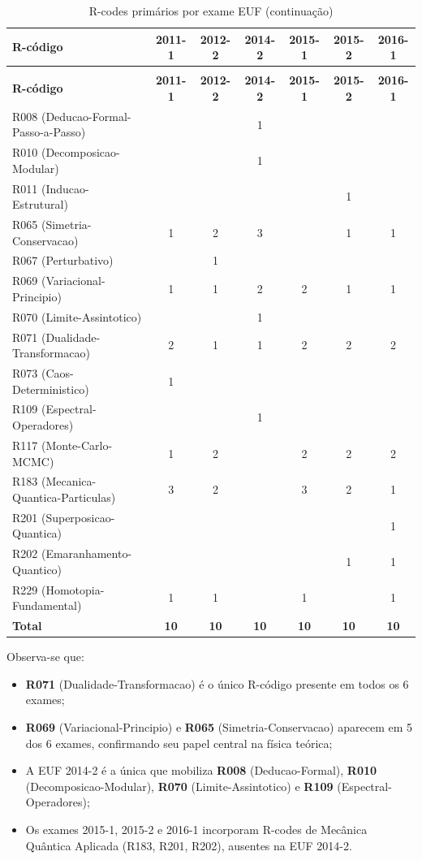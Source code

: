 \documentclass[12pt,a4paper]{article}
\newcommand{\rcode}[1]{\textcolor{azulprof}{\textbf{#1}}}
\begin{document}
\small
\begin{longtable}{lcccccc}
\caption{R-codes primários por exame EUF}
\label{tab:comparativo_rcodes}\\
\toprule
\textbf{R-código} & \textbf{2011-1} & \textbf{2012-2} & \textbf{2014-2} & \textbf{2015-1} & \textbf{2015-2} & \textbf{2016-1} \\
\midrule
\endfirsthead

\caption[]{R-codes primários por exame EUF (continuação)}\\
\toprule
\textbf{R-código} & \textbf{2011-1} & \textbf{2012-2} & \textbf{2014-2} & \textbf{2015-1} & \textbf{2015-2} & \textbf{2016-1} \\
\midrule
\endhead

\bottomrule
\endfoot

R008 (Deducao-Formal-Passo-a-Passo) & & & 1 & & & \\
R010 (Decomposicao-Modular) & & & 1 & & & \\
R011 (Inducao-Estrutural) & & & & & 1 & \\
R065 (Simetria-Conservacao) & 1 & 2 & 3 & & 1 & 1 \\
R067 (Perturbativo) & & 1 & & & & \\
R069 (Variacional-Principio) & 1 & 1 & 2 & 2 & 1 & 1 \\
R070 (Limite-Assintotico) & & & 1 & & & \\
R071 (Dualidade-Transformacao) & 2 & 1 & 1 & 2 & 2 & 2 \\
R073 (Caos-Deterministico) & 1 & & & & & \\
R109 (Espectral-Operadores) & & & 1 & & & \\
R117 (Monte-Carlo-MCMC) & 1 & 2 & & 2 & 2 & 2 \\
R183 (Mecanica-Quantica-Particulas) & 3 & 2 & & 3 & 2 & 1 \\
R201 (Superposicao-Quantica) & & & & & & 1 \\
R202 (Emaranhamento-Quantico) & & & & & 1 & 1 \\
R229 (Homotopia-Fundamental) & 1 & 1 & & 1 & & 1 \\
\midrule
\textbf{Total} & \textbf{10} & \textbf{10} & \textbf{10} & \textbf{10} & \textbf{10} & \textbf{10} \\
\end{longtable}

\normalsize
\noindent Observa-se que:
\begin{itemize}
  \item \rcode{R071} (Dualidade-Transformacao) é o único R-código presente
    em todos os 6 exames;
  \item \rcode{R069} (Variacional-Principio) e \rcode{R065}
    (Simetria-Conservacao) aparecem em 5 dos 6 exames, confirmando seu
    papel central na física teórica;
  \item A EUF 2014-2 é a única que mobiliza \rcode{R008}
    (Deducao-Formal), \rcode{R010} (Decomposicao-Modular),
    \rcode{R070} (Limite-Assintotico) e \rcode{R109}
    (Espectral-Operadores);
  \item Os exames 2015-1, 2015-2 e 2016-1 incorporam R-codes de
    Mecânica Quântica Aplicada (R183, R201, R202), ausentes na
    EUF 2014-2.
\end{itemize}
\end{document}
